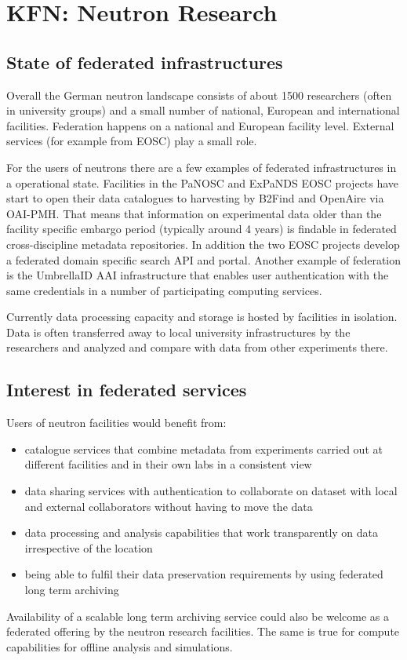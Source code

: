 \section{KFN: Neutron Research}


\subsection{State of federated infrastructures}

Overall the German neutron landscape consists of about 1500 researchers 
(often in university groups) and a small number of national, 
European and international
facilities. Federation happens on a 
national and European facility level. External services (for example from EOSC) play a small role.

For the users of neutrons there are a few examples of 
federated infrastructures in a operational state.
Facilities in the PaNOSC and ExPaNDS EOSC projects 
have start to open their data catalogues
to harvesting by B2Find and OpenAire via OAI-PMH. That means that information on
experimental data older than the facility specific embargo period (typically around 4 years)
is findable in federated cross-discipline metadata repositories.
In addition the two EOSC projects develop a federated domain specific search API and portal.
Another example of federation is the UmbrellaID AAI infrastructure that enables
user authentication with the same credentials in a number of participating   
computing services. 

Currently data processing capacity and storage  
is hosted by facilities in isolation. Data is often transferred away to 
local university infrastructures by the researchers and analyzed 
and compare with data from other experiments there.

\subsection{Interest in federated services}

Users of neutron facilities would benefit from:

\begin{itemize}
\item catalogue services that combine metadata from experiments carried out at different facilities and in their own labs in a consistent view
\item data sharing services with authentication to collaborate on dataset with local and external collaborators without having to move the data
\item data processing and analysis capabilities that work transparently on data irrespective of the location
\item being able to fulfil their data preservation requirements by using federated long term archiving
\end{itemize}

Availability of a 
scalable long term archiving service 
could also be welcome as a federated offering by the neutron research facilities. 
The same is true
for compute capabilities for offline analysis and simulations.